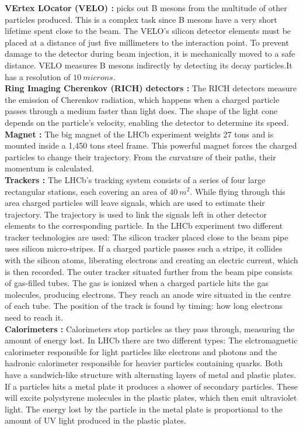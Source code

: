 \documentclass[english]{uzhpub}
\begin{document}
\textbf{VErtex LOcator (VELO) \cite{bib:velo} :} picks out B mesons from the multitude of other particles produced. This is a complex task since B mesons have a very short lifetime spent close to the beam. The VELO’s silicon detector elements must be placed at a distance of just five millimeters to the interaction point. To prevent damage to the detector during beam injection, it is mechanically moved to a safe distance. VELO measures B mesons indirectly by detecting its decay particles.It has a resolution of $\SI{10}{microns}$.\\
\textbf{Ring Imaging Cherenkov (RICH) detectors \cite{bib:rich} :} The RICH detectors measure the emission of Cherenkov radiation, which happens when a charged particle passes through a medium faster than light does. The shape of the light cone depends on the particle’s velocity, enabling the detector to determine its speed.  \\
\textbf{Magnet \cite{bib:mag} :} The big magnet of the LHCb experiment weights 27 tons and is mounted inside a 1,450 tons steel frame. This powerful magnet forces the charged particles to change their trajectory. From the curvature of their paths, their momentum is calculated.  \\
\textbf{Trackers \cite{bib:trac} :} The LHCb’s tracking system consists of a series of four large rectangular stations, each covering an area of  $\SI{40}{m^2}$. While flying through this area charged particles will leave signals, which are used to estimate their trajectory. The trajectory is used to link the signals left in other detector elements to the corresponding particle. In the LHCb experiment two different tracker technologies are used:  The silicon tracker placed close to the beam pipe uses silicon micro-stripes. If a charged particle passes such a stripe, it collides with the silicon atoms, liberating electrons and creating an electric current, which is then recorded. The outer tracker situated further from the beam pipe consists of gas-filled tubes. The gas is ionized when a charged particle hits the gas molecules, producing electrons. They reach an anode wire situated in the centre of each tube. The position of the track is found by timing: how long electrons need to reach it. \\
\textbf{Calorimeters \cite{bib:calo} :} Calorimeters stop particles as they pass through, measuring the amount of energy lost. In LHCb there are two different types: The elctromagnetic calorimeter responsible for light particles like electrons and photons and the hadronic calorimeter responsible for heavier particles containing quarks. Both have a sandwich-like structure with alternating layers of metal and plastic plates. If a particles hits a metal plate it produces a shower of secondary particles. These will excite polystyrene molecules in the plastic plates, which then emit ultraviolet light. The energy lost by the particle in the metal plate is proportional to the amount of UV light produced in the plastic plates. \\
\end{document}
